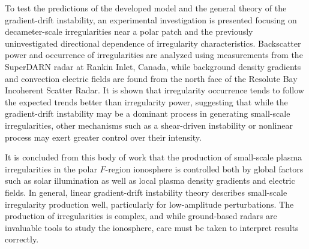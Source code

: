 To test the predictions of the developed model and the general theory of the gradient-drift instability, an experimental investigation is presented focusing on decameter-scale irregularities near a polar patch and the previously uninvestigated directional dependence of irregularity characteristics.  Backscatter power and occurrence of irregularities are analyzed using measurements from the SuperDARN radar at Rankin Inlet, Canada, while background density gradients and convection electric fields are found from the north face of the Resolute Bay Incoherent Scatter Radar.  It is shown that irregularity occurrence tends to follow the expected trends better than irregularity power, suggesting that while the gradient-drift instability may be a dominant process in generating small-scale irregularities, other mechanisms such as a shear-driven instability or nonlinear process may exert greater control over their intensity.

It is concluded from this body of work that the production of small-scale plasma irregularities in the polar \(F\)-region ionosphere is controlled both by global factors such as solar illumination as well as local plasma density gradients and electric fields.  In general, linear gradient-drift instability theory describes small-scale irregularity production well, particularly for low-amplitude perturbations.  The production of irregularities is complex, and while ground-based radars are invaluable tools to study the ionosphere, care must be taken to interpret results correctly.
